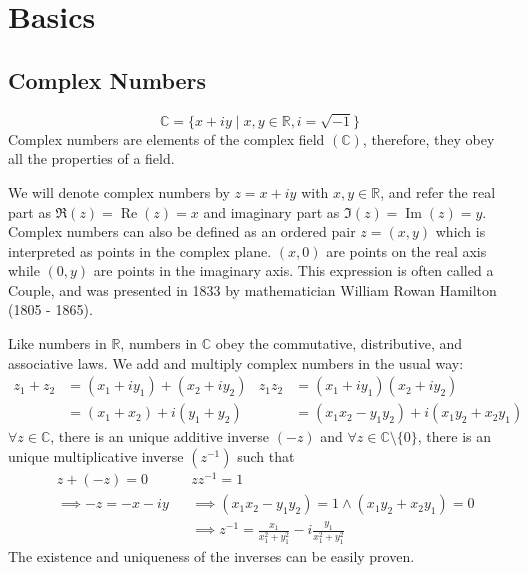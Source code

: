 \documentclass[12pt, english]{book}
\begin{document}
	\chapter{Basics} \label{Basics Chapter - Complex}
	\section{Complex Numbers} \label{Complex Numbers Section - Complex}
	$$\mathbb{C} = \{x + iy \mid x, y \in \mathbb{R}, i = \sqrt{-1}\}$$
	Complex numbers are elements of the complex field $(\mathbb{C})$, therefore, they obey all the properties of a field. 
	
	We will denote complex numbers by $z = x + iy$ with $x, y \in \mathbb{R}$, and refer the real part as $\Re(z) = \operatorname{Re}(z) = x$ and imaginary part as $\Im(z) = \operatorname{Im}(z) = y$. Complex numbers can also be defined as an ordered pair $z = (x, y)$ which is interpreted as points in the complex plane. $(x, 0)$ are points on the real axis while $(0 , y)$ are points in the imaginary axis. This expression is often called a Couple, and was presented in 1833 by mathematician William Rowan Hamilton (1805 - 1865).
	
	\begin{center}
	\end{center}
	Like numbers in $\mathbb{R}$, numbers in $\mathbb{C}$ obey the commutative, distributive, and associative laws. We add and multiply complex numbers in the usual way: 
	\begin{align*}
		z_1 + z_2 &= (x_1 + iy_1) + (x_2 + iy_2) & z_1 z_2 &= (x_1 + iy_1) (x_2 + iy_2) \\
			&= (x_1 + x_2) + i(y_1 + y_2) & &=(x_1 x_2 - y_1 y_2) + i(x_1 y_2 + x_2 y_1)
	\end{align*}
	$\forall z \in \mathbb{C}$, there is an unique additive inverse $(-z)$ and $\forall z \in \mathbb{C}\setminus\{0\}$, there is an unique multiplicative inverse $(z^{-1})$ such that 
	\begin{align*}
		&z + (-z) = 0  & &zz^{-1} = 1 \\
		&\implies -z = -x - iy & &\implies (x_1 x_2 - y_1 y_2) = 1 \land (x_1 y_2 + x_2 y_1) = 0 \\
		& & &\implies z^{-1} = \frac{x_1}{x_1^2 + y_1^2} - i \frac{y_1}{x_1^2 + y_1^2}
	\end{align*}
	The existence and uniqueness of the inverses can be easily proven. 
	
\end{document}
